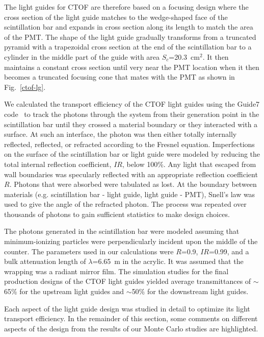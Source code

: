 \documentclass[3p,times,twocolumn]{elsarticle}
\begin{document}
The light guides for CTOF are therefore based on a focusing design where the cross section of the light
guide matches to the wedge-shaped face of the scintillation bar and expands in cross section along its
length to match the area of the PMT. The shape of the light guide gradually transforms from a truncated
pyramid with a trapezoidal cross section at the end of the scintillation bar to a cylinder in the middle part
of the guide with area $S_c$=20.3~cm$^2$. It then maintains a constant cross section until very near the
PMT location when it then becomes a truncated focusing cone that mates with the PMT as shown in
Fig.~\ref{ctof-lg}.

We calculated the transport efficiency of the CTOF light guides using the Guide7 code~\cite{guide7} to
track the photons through the system from their generation point in the scintillation bar until they crossed
a material boundary or they interacted with a surface. At such an interface, the photon was then either
totally internally reflected, reflected, or refracted according to the Fresnel equation. Imperfections on
the surface of the scintillation bar or light guide were modeled by reducing the total internal reflection
coefficient, $IR$, below 100\%. Any light that escaped from wall boundaries was specularly reflected
with an appropriate reflection coefficient $R$. Photons that were absorbed were tabulated as lost. At
the boundary between materials (e.g. scintillation bar - light guide, light guide - PMT), Snell's law was
used to give the angle of the refracted photon. The process was repeated over thousands of photons to
gain sufficient statistics to make design choices.

The photons generated in the scintillation bar were modeled assuming that minimum-ionizing particles were
perpendicularly incident upon the middle of the counter. The parameters used in our calculations were
$R$=0.9, $IR$=0.99, and a bulk attenuation length of $\lambda$=6.65~m in the acrylic. It was assumed
that the wrapping was a radiant mirror film. The simulation studies for the final production designs of the
CTOF light guides yielded average transmittances of $\sim$65\% for the upstream light guides and
$\sim$50\% for the downstream light guides.

Each aspect of the light guide design was studied in detail to optimize its light transport efficiency. In the
remainder of this section, some comments on different aspects of the design from the results of our Monte
Carlo studies are highlighted.
\end{document}
